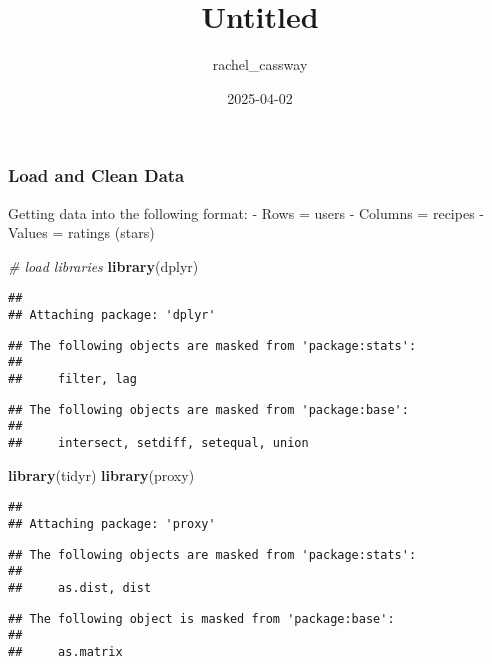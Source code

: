 \documentclass[
]{article}
\title{Untitled}
\author{rachel\_cassway}
\date{2025-04-02}
\newenvironment{Shaded}{\begin{snugshade}}{\end{snugshade}}
\newcommand{\CommentTok}[1]{\textcolor[rgb]{0.56,0.35,0.01}{\textit{#1}}}
\newcommand{\FunctionTok}[1]{\textcolor[rgb]{0.13,0.29,0.53}{\textbf{#1}}}
\newcommand{\NormalTok}[1]{#1}
\begin{document}
\maketitle

\subsubsection{Load and Clean Data}\label{load-and-clean-data}

Getting data into the following format: - Rows = users - Columns =
recipes - Values = ratings (stars)

\begin{Shaded}
\begin{Highlighting}[]
\CommentTok{\# load libraries}
\FunctionTok{library}\NormalTok{(dplyr)}
\end{Highlighting}
\end{Shaded}

\begin{verbatim}
## 
## Attaching package: 'dplyr'
\end{verbatim}

\begin{verbatim}
## The following objects are masked from 'package:stats':
## 
##     filter, lag
\end{verbatim}

\begin{verbatim}
## The following objects are masked from 'package:base':
## 
##     intersect, setdiff, setequal, union
\end{verbatim}

\begin{Shaded}
\begin{Highlighting}[]
\FunctionTok{library}\NormalTok{(tidyr)}
\FunctionTok{library}\NormalTok{(proxy)}
\end{Highlighting}
\end{Shaded}

\begin{verbatim}
## 
## Attaching package: 'proxy'
\end{verbatim}

\begin{verbatim}
## The following objects are masked from 'package:stats':
## 
##     as.dist, dist
\end{verbatim}

\begin{verbatim}
## The following object is masked from 'package:base':
## 
##     as.matrix
\end{verbatim}
\end{document}
